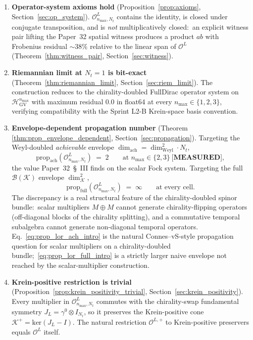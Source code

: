 \documentclass[11pt,a4paper]{article}
\theoremstyle{plain}
\theoremstyle{definition}
\newcommand{\nmax}{n_{\max}}
\newcommand{\Nt}{N_t}
\newcommand{\Krein}{\mathcal{K}}
\newcommand{\Op}{\mathcal{O}}
\newcommand{\Bcal}{\mathcal{B}}
\newcommand{\JL}{J_L}
\newcommand{\HGV}{\mathcal{H}_{\mathrm{GV}}}
\newcommand{\prop}{\mathrm{prop}}
\newcommand{\Weyl}{\mathrm{Weyl}}
\newcommand{\achievable}{\mathrm{ach}}
\begin{document}
\begin{enumerate}\setlength{\itemsep}{2pt}
\item \textbf{Operator-system axioms hold} (Proposition~\ref{prop:axioms},
Section~\ref{sec:op_system}). $\Op_{\nmax, \Nt}^L$ contains the
identity, is closed under conjugate transposition, and is \emph{not}
multiplicatively closed:\ an explicit witness pair lifting the
Paper~32 spatial witness produces a product $ab$ with Frobenius
residual $\sim 38\%$ relative to the linear span of $\Op^L$
(Theorem~\ref{thm:witness_pair}, Section~\ref{sec:witness}).
\item \textbf{Riemannian limit at $\Nt = 1$ is bit-exact}
(Theorem~\ref{thm:riemannian_limit}, Section~\ref{sec:riem_limit}). The
construction reduces to the chirality-doubled FullDirac operator
system on $\HGV^{\nmax}$ with maximum residual $0.0$ in float64 at
every $\nmax \in \{1, 2, 3\}$, verifying compatibility with the
Sprint L2-B Krein-space basis convention.
\item \textbf{Envelope-dependent propagation number} (Theorem~%
\ref{thm:prop_envelope_dependent}, Section~\ref{sec:propagation}).
Targeting the Weyl-doubled \emph{achievable} envelope
$\dim_\achievable = \dim_\Weyl^2 \cdot \Nt$,
\begin{equation}\label{eq:prop_lor_ach_intro}
   \prop_{\achievable}(\Op_{\nmax, \Nt}^L) \;=\; 2
   \qquad \text{at } \nmax \in \{2, 3\} \ \textbf{[MEASURED]},
\end{equation}
the value Paper~32~\S~III finds on the scalar Fock system. Targeting the full $\Bcal(\Krein)$
envelope $\dim_\Krein^2$,
\begin{equation}\label{eq:prop_lor_full_intro}
   \prop_{\mathrm{full}}(\Op_{\nmax, \Nt}^L) \;=\; \infty
   \qquad \text{at every cell.}
\end{equation}
The discrepancy is a real structural feature of the chirality-doubled
spinor bundle:\ scalar multipliers $M \oplus M$ cannot generate
chirality-flipping operators (off-diagonal blocks of the chirality
splitting), and a commutative temporal subalgebra cannot generate
non-diagonal temporal operators. Eq.~\eqref{eq:prop_lor_ach_intro} is
the natural Connes--vS-style propagation question for scalar
multipliers on a chirality-doubled bundle;\
\eqref{eq:prop_lor_full_intro} is a strictly larger naive envelope not
reached by the scalar-multiplier construction.
\item \textbf{Krein-positive restriction is trivial}
(Proposition~\ref{prop:krein_positivity_trivial},
Section~\ref{sec:krein_positivity}). Every multiplier in
$\Op_{\nmax, \Nt}^L$ commutes with the chirality-swap fundamental
symmetry $\JL = \gamma^0 \otimes I_{\Nt}$, so it preserves the
Krein-positive cone $\Krein^+ = \mathrm{ker}(\JL - I)$. The natural
restriction $\Op^{L,+}$ to Krein-positive preservers equals
$\Op^L$ itself.
\end{enumerate}
\end{document}
